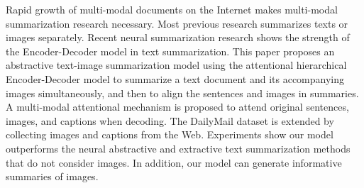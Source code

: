 Rapid growth of multi-modal documents on the Internet makes multi-modal summarization research necessary. Most previous research summarizes texts or images separately. Recent neural summarization research shows the strength of the Encoder-Decoder model in text summarization. This paper proposes an abstractive text-image summarization model using the attentional hierarchical Encoder-Decoder model to summarize a text document and its accompanying images simultaneously, and then to align the sentences and images in summaries. A multi-modal attentional mechanism is proposed to attend original sentences, images, and captions when decoding. The DailyMail dataset is extended by collecting images and captions from the Web.  Experiments show our model outperforms the neural abstractive and extractive text summarization methods that do not consider images. In addition, our model can generate informative summaries of images.
